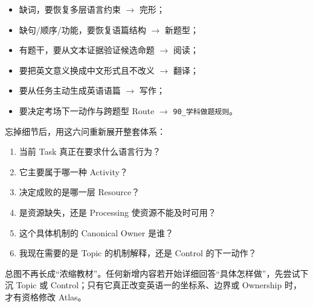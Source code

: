 \documentclass[11pt,a4paper]{ctexart}
\begin{document}
\begin{method}[题型路由]
\begin{itemize}
  \item 缺词，要恢复多层语言约束 $\to$ 完形；
  \item 缺句/顺序/功能，要恢复语篇结构 $\to$ 新题型；
  \item 有题干，要从文本证据验证候选命题 $\to$ 阅读；
  \item 要把英文意义换成中文形式且不改义 $\to$ 翻译；
  \item 要从任务主动生成英语语篇 $\to$ 写作；
  \item 要决定考场下一动作与跨题型 Route $\to$ \texttt{90\_学科做题规则}。
\end{itemize}
\end{method}

\begin{exam}[六个重建问题]
忘掉细节后，用这六问重新展开整套体系：
\begin{enumerate}
  \item 当前 Task 真正在要求什么语言行为？
  \item 它主要属于哪一种 Activity？
  \item 决定成败的是哪一层 Resource？
  \item 是资源缺失，还是 Processing 使资源不能及时可用？
  \item 这个具体机制的 Canonical Owner 是谁？
  \item 我现在需要的是 Topic 的机制解释，还是 Control 的下一动作？
\end{enumerate}
\end{exam}

\begin{warn}[最终纪律]
总图不再长成“浓缩教材”。任何新增内容若开始详细回答“具体怎样做”，先尝试下沉 Topic 或 Control；只有它真正改变英语一的坐标系、边界或 Ownership 时，才有资格修改 Atlas。
\end{warn}
\end{document}
